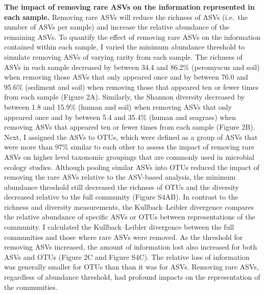 \documentclass[
]{article}
\begin{document}
\textbf{The impact of removing rare ASVs on the information represented
in each sample.} Removing rare ASVs will reduce the richness of ASVs
(i.e.~the number of ASVs per sample) and increase the relative abundance
of the remaining ASVs. To quantify the effect of removing rare ASVs on
the information contained within each sample, I varied the minimum
abundance threshold to simulate removing ASVs of varying rarity from
each sample. The richness of ASVs in each sample decreased by between
34.4 and 86.2\% (peromyscus and soil) when removing those ASVs that only
appeared once and by between 76.0 and 95.6\% (sediment and soil) when
removing those that appeared ten or fewer times from each sample (Figure
2A). Similarly, the Shannon diversity decreased by between 1.8 and
15.9\% (human and soil) when removing ASVs that only appeared once and
by between 5.4 and 35.4\% (human and seagrass) when removing ASVs that
appeared ten or fewer times from each sample (Figure 2B). Next, I
assigned the ASVs to OTUs, which were defined as a group of ASVs that
were more than 97\% similar to each other to assess the impact of
removing rare ASVs on higher level taxonomic groupings that are commonly
used in microbial ecology studies. Although pooling similar ASVs into
OTUs reduced the impact of removing the rare ASVs relative to the
ASV-based analysis, the minimum abundance threshold still decreased the
richness of OTUs and the diversity decreased relative to the full
community (Figure S4AB). In contrast to the richness and diversity
measurements, the Kullback--Leibler divergence compares the relative
abundance of specific ASVs or OTUs between representations of the
community. I calculated the Kullback--Leibler divergence between the
full communities and those where rare ASVs were removed. As the
threshold for removing ASVs increased, the amount of information lost
also increased for both ASVs and OTUs (Figure 2C and Figure S4C). The
relative loss of information was generally smaller for OTUs than than it
was for ASVs. Removing rare ASVs, regardless of abundance threshold, had
profound impacts on the representation of the communities.
\end{document}
